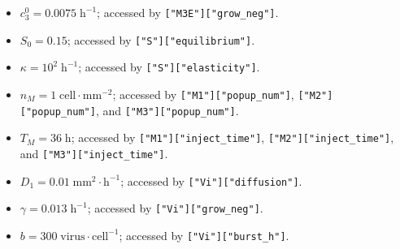 \documentclass[reqno]{amsart}
\theoremstyle{definition}
\theoremstyle{remark}
\numberwithin{equation}{section}
\numberwithin{figure}{section}
\begin{document}
\begin{itemize}
  \item {\color{cyan}$c_3^0=0.0075\;\textrm{h}^{-1}$}; accessed by {\color{green}\texttt{["M3E"]["grow\_neg"]}}.
  \item {\color{red} $S_0=0.15$}; accessed by {\color{green}\texttt{["S"]["equilibrium"]}}.
  \item {\color{red} $\kappa=10^2\;\textrm{h}^{-1}$}; accessed by {\color{green}\texttt{["S"]["elasticity"]}}.
  \item {\color{red} $n_M=1\;\textrm{cell}\cdot\textrm{mm}^{-2}$}; accessed by {\color{green}\texttt{["M1"]["popup\_num"]}}, {\color{green}\texttt{["M2"]["popup\_num"]}}, and {\color{green}\texttt{["M3"]["popup\_num"]}}.
  \item {\color{red} $T_M=36\;\textrm{h}$}; accessed by {\color{green}\texttt{["M1"]["inject\_time"]}}, {\color{green}\texttt{["M2"]["inject\_time"]}}, and {\color{green}\texttt{["M3"]["inject\_time"]}}.
  \item {\color{cyan}$D_1=0.01\;\textrm{mm}^2\cdot\textrm{h}^{-1}$}; accessed by {\color{green}\texttt{["Vi"]["diffusion"]}}.
  \item {\color{cyan}$\gamma=0.013\;\textrm{h}^{-1}$}; accessed by {\color{green}\texttt{["Vi"]["grow\_neg"]}}.
  \item {\color{cyan}$b=300\;\textrm{virus}\cdot\textrm{cell}^{-1}$}; accessed by {\color{green}\texttt{["Vi"]["burst\_h"]}}.
\end{itemize}
\end{document}
